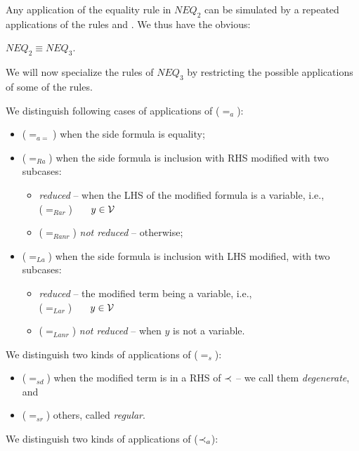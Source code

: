 \noindent
Any application of the equality rule  in $NEQ_2$ can be simulated
by a repeated applications of the rules  and . We
thus have the obvious:
\begin{LEMMA}\label{le:neq2isneq3}
 $NEQ_2 \equiv NEQ_3$.
\end{LEMMA}
%
\noindent
We will now specialize the rules of $NEQ_3$ by restricting the possible
applications of some of the rules.
%
\begin{DEFINITION}\label{de:eqALR}\label{de:eqSD}\label{de:inclad}\label{de:anr}
We distinguish following cases of applications of ($=_a$):
\begin{itemize}\MyLPar
\item ($=_{a=}$) when the side formula is equality;
\item ($=_{Ra}$) when the side formula is inclusion with RHS modified with
two subcases:
\begin{itemize}\MyLPar
\item {\em reduced} -- when the LHS of the modified formula is a
variable, i.e., \\
 ($=_{Rar}$)\ \  \ $y\in{\cal V}$
\item ($=_{Ranr}$) {\em not reduced} -- otherwise;
\end{itemize}
\item ($=_{La}$) when the side formula is inclusion with LHS modified, with
two subcases:
\begin{itemize}\MyLPar
\item {\em reduced} -- the modified term being a variable, i.e., \\
  ($=_{Lar}$) \ \ \ $y\in{\cal V}$
\item ($=_{Lanr}$) {\em not reduced} -- when $y$ is not a variable.
\end{itemize}
\end{itemize}
We distinguish two kinds of applications of ($=_s$):
\begin{itemize}\MyLPar
\item ($=_{sd}$)  when the modified term is in a RHS of $\mathbin{\prec}$ -- we call
them {\em degenerate}, and
\item ($=_{sr}$) others, called {\em regular}.
\end{itemize}
We distinguish two kinds of applications of ($\mathbin{\prec}_a$):

\end{DEFINITION}
